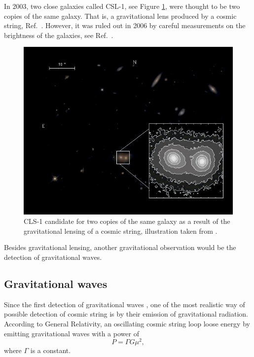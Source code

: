 In 2003, two close galaxies called CSL-1, see Figure \ref{fig:csl1}, were thought to be two copies of the same galaxy. That is, a gravitational lens produced by a cosmic string, Ref.\ \cite{Sazhin2003}. However, it was ruled out in 2006 by careful measurements on the brightness of the galaxies, see Ref.\ \cite{Agol2006}.

\begin{figure}
	\centering
	\includegraphics[scale=0.5]{./figures/csl1.jpg}
	\caption{CLS-1 candidate for two copies of the same galaxy as a result of the gravitational lensing of a cosmic string, illustration taken from \cite{Agol2006}.}
	\label{fig:csl1}
\end{figure}
 
 
  Besides gravitational lensing, another gravitational observation would be the detection of gravitational waves.
 
\subsection{Gravitational waves} 

Since the first detection of gravitational waves \cite{PhysRevLett.116.061102}, one of the most realistic way of possible detection of cosmic string is by their emission of gravitational radiation.
According to General Relativity, an oscillating cosmic string loop loose energy by emitting gravitational waves with a power of
\begin{equation}
	P = \Gamma G\mu^2,
\end{equation}
where $\Gamma$ is a constant. 

